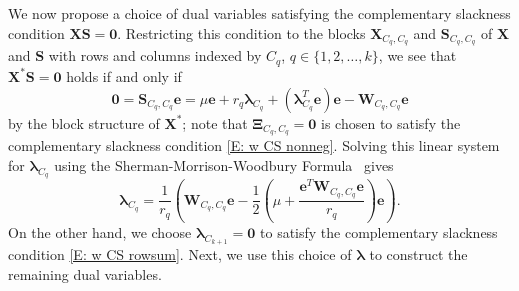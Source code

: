 \documentclass[twoside,11pt]{article}
\renewcommand{\S}{\mathbf{S}}
\newcommand{\E}{\mathbf{E}}
\newcommand{\e}{\bs {e}}
\newcommand{\bs}{\boldsymbol}
\newcommand{\X}{\bs {X}}
\newcommand{\W}{\bs {W}}
\newcommand{\0}{\bs{0}}
\newcommand{\sbra}[1] {\ensuremath{ \left[ #1\right]}} %
\newcommand{\rbra}[1]{\ensuremath{\left( #1 \right)}} %
\begin{document}
{%
We now propose a choice of dual variables satisfying the complementary slackness condition \(\X\S = \bs 0\).
Restricting this condition to the blocks \(\X_{C_q, C_q}\) and \(\S_{C_q, C_q}\) of \(\X\) and \(\S\) with
rows and columns indexed by \(C_q\), \(q \in\{1,2,\dots, k\}\), we see that \(\X^*\S=\bs 0\) holds if and only if
\[
\bs 0 = \S_{C_q, C_q} \e = %
\mu \e  + r_q \bs\lambda_{C_q} + (\bs\lambda_{C_q}^T \e) \e - \W_{C_q, C_q} \e
\]
by the block structure of \(\X^*\);
note that \(\bs\Xi_{C_q, C_q} = \bs 0\) is chosen to satisfy the complementary slackness condition \eqref{E: w CS nonneg}.
Solving this linear system for \(\bs\lambda_{C_q}\) 
using the Sherman-Morrison-Woodbury 
Formula~\cite[Equation (2.1.4)]{golub2013matrix} gives
\begin{equation} \label{eq: lam q}
\bs \lambda_{C_q} = \frac{1}{r_q} \left( \W_{C_q, C_q} \e - \frac{1}{2} 
\left(\mu + \frac{ \e^T \W_{C_q, C_q} \e}{r_q} \right)   \e \right).
\end{equation}
On the other hand, we choose \(\bs\lambda_{C_{k+1}} = \0\)
to satisfy the complementary slackness condition 
\eqref{E: w CS rowsum}. %
Next, we use this choice of \(\bs \lambda\) to construct the remaining dual variables.

}
\end{document}

